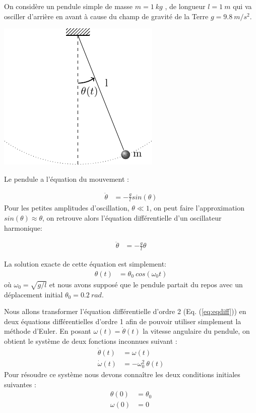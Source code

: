 \documentclass[%
oneside,                 %
final,                   %
10pt,french]{article}
\newenvironment{doconceexercise}{}{}
\newcounter{doconceexercisecounter}
\begin{document}
\begin{doconceexercise}


\label{ex:exacte}

On considère un pendule simple de masse $m =1 \ kg$ , de longueur $l=1 \ m$ qui va osciller d’arrière en avant à cause du champ de gravité de la Terre $g = 9.8 \ m/s^2$.



\vspace{6mm}

\centerline{\includegraphics[width=0.4\linewidth]{imgs/pendule.pdf}}

\vspace{6mm}



Le pendule a l'équation du mouvement :

\begin{align}
\ddot{\theta} &= - \frac{g}{l} sin(\theta)
\end{align}
Pour les petites amplitudes d'oscillation, $\theta \ll 1$, on peut faire l'approximation $sin(\theta) \approx \theta$, on retrouve alors l’équation différentielle d’un oscillateur harmonique:

\begin{align}
\label{eq:eqdiff}
\ddot{\theta} &= - \frac{g}{l} \theta
\end{align}

La solution exacte de cette équation est simplement:
\begin{align}
\label{eq:solexacte}
\theta (t) &= \theta_0 \ cos(\omega_0 t)
\end{align}
où $\omega_0 = \sqrt{g/l}$ et nous avons supposé que le pendule partait du repos avec un déplacement initial $\theta_0 =0.2 \ rad$.


Nous allons transformer l'équation différentielle d’ordre 2 (Eq. (\ref{eq:eqdiff})) en deux équations différentielles d’ordre 1 afin de pouvoir utiliser simplement la méthode d’Euler. En posant $\omega (t)= \dot{\theta}(t)$ la vitesse angulaire du pendule, on obtient le système de deux fonctions inconnues suivant :
\begin{align}
\dot{\theta} (t) &= \omega (t) \\
\dot{\omega }(t) &= - \omega_0^2 \ \theta (t)
\end{align}
Pour résoudre ce système nous devons connaître les deux conditions initiales suivantes :
\begin{align*}
\theta(0) &= \theta_0 \\
\omega (0) &= 0
\end{align*}



\end{doconceexercise}
\end{document}
